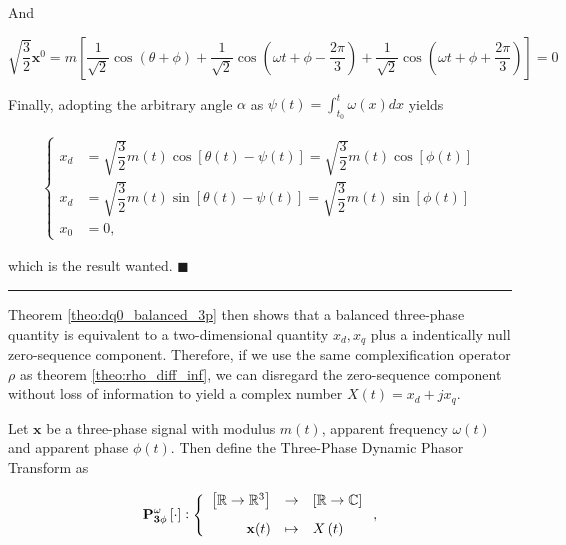 	And 

\begin{equation} \sqrt{\dfrac{3}{2}}\mathbf{x}^{0} = m\left[\dfrac{1}{\sqrt{2}}\cos\left(\theta + \phi\right) + \dfrac{1}{\sqrt{2}}\cos\left(\omega t + \phi - \dfrac{2\pi}{3}\right) + \dfrac{1}{\sqrt{2}}\cos\left(\omega t + \phi + \dfrac{2\pi}{3}\right)\right] = 0 \end{equation}

	Finally, adopting the arbitrary angle $\alpha$ as  $\psi(t) = \displaystyle \int_{t_0}^t \omega(x)dx$ yields

\begin{align}
\left\{ \begin{array}{rl}
	x_d &= \sqrt{\dfrac{3}{2}}m(t)\cos\left[\theta(t) - \psi(t)\right] = \sqrt{\dfrac{3}{2}}m(t)\cos\left[\phi(t)\right] \\[5mm]
	x_d &= \sqrt{\dfrac{3}{2}}m(t)\sin\left[\theta(t) - \psi(t)\right] = \sqrt{\dfrac{3}{2}}m(t)\sin\left[\phi(t)\right] \\[5mm]
	x_0 &= 0,
\end{array}\right.
\end{align}


	which is the result wanted. \hfill $\blacksquare$

\vspace{5mm}
\hrule
\vspace{5mm}

	Theorem \ref{theo:dq0_balanced_3p} then shows that a balanced three-phase quantity is equivalent to a two-dimensional quantity $x_d,x_q$ plus a indentically null zero-sequence component. Therefore, if we use the same complexification operator $\rho$ as theorem \ref{theo:rho_diff_inf}, we can disregard the zero-sequence component without loss of information to yield a complex number $X(t) = x_d + jx_q$.

\begin{definition} \label{theo:clarke_park_phasor_transform}%
	Let $\mathbf{x}$ be a three-phase signal with modulus $m(t)$, apparent frequency $\omega(t)$ and apparent phase $\phi(t)$. Then define the Three-Phase Dynamic Phasor Transform as 

\begin{equation}
	\mathbf{P_{3\phi}^{\omega}}\left[\cdot\right] \vcentcolon \left\{\begin{array}{rcl}
	\left[\mathbb{R}\to \mathbb{R}^3\right] &\to& \left[\mathbb{R}\to \mathbb{C}\right]\\[3mm]
	\mathbf{x}(t) &\mapsto& X\left(t\right)
\end{array}\right. ,
\end{equation}
\end{definition}

